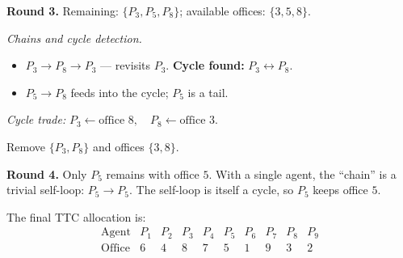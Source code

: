 {%
\medskip
\noindent\textbf{Round 3.} Remaining: $\{P_3, P_5, P_8\}$; available offices: $\{3, 5, 8\}$.

\begin{center}
\end{center}

\noindent\emph{Chains and cycle detection.}
\begin{itemize}
    \item $P_3\!\to\!P_8\!\to\!P_3$ --- revisits $P_3$. \textbf{Cycle found:} $P_3\!\leftrightarrow\!P_8$.
    \item $P_5\!\to\!P_8$ feeds into the cycle; $P_5$ is a tail.
\end{itemize}

\noindent\emph{Cycle trade:} $P_3 \gets \text{office } 8,\quad P_8 \gets \text{office } 3.$

\noindent Remove $\{P_3, P_8\}$ and offices $\{3, 8\}$.

\medskip
\noindent\textbf{Round 4.} Only $P_5$ remains with office $5$. With a single agent, the ``chain'' is a trivial self-loop: $P_5\!\to\!P_5$. The self-loop is itself a cycle, so $P_5$ keeps office $5$.

\medskip
\noindent The final TTC allocation is:
\[
\begin{array}{c|ccccccccc}
  \text{Agent}  & P_1 & P_2 & P_3 & P_4 & P_5 & P_6 & P_7 & P_8 & P_9 \\
  \hline
  \text{Office} &  6  &  4  &  8  &  7  &  5  &  1  &  9  &  3  &  2
\end{array}
\]
}

